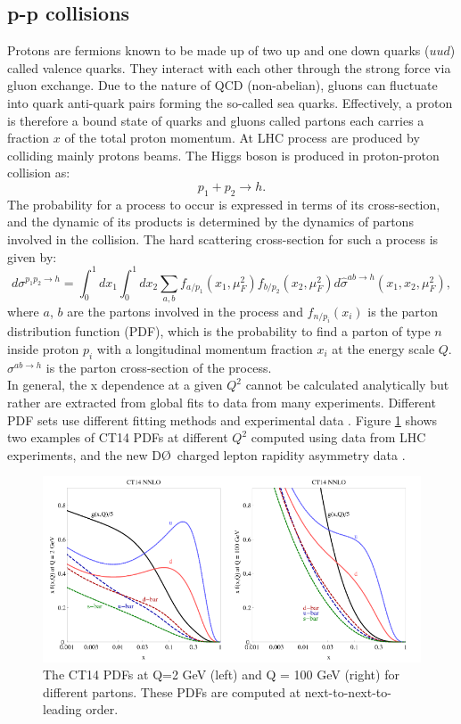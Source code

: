 \subsection{p-p collisions}
\label{chap1:H2012:PP}
Protons are fermions known to be made up of two up and one down quarks ($uud$) called valence quarks. They interact with each other through the strong force via gluon exchange. Due to the nature of QCD (non-abelian), gluons can fluctuate into quark anti-quark pairs forming the so-called sea quarks. Effectively, a proton is therefore a bound state of quarks and gluons called partons each carries a fraction $x$ of the total proton momentum. At LHC process are produced by colliding mainly protons beams. The Higgs boson is produced in proton-proton collision as:
\begin{equation}
    p_1 + p_2 \rightarrow h.
\end{equation}
The probability for a process to occur is expressed in terms of its cross-section, and the dynamic of its products is determined by the dynamics of partons involved in the collision. The hard scattering cross-section for such a process is given by:
\begin{equation}
    d \sigma^{p_{1} p_{2} \rightarrow h}=\int_{0}^{1} d x_{1} \int_{0}^{1} d x_{2} \sum_{a, b} f_{a / p_{1}}\left(x_{1}, \mu_{F}^{2}\right) f_{b / p_{2}}\left(x_{2}, \mu_{F}^{2}\right) d \hat{\sigma}^{a b \rightarrow h}\left(x_1, x_2, \mu_{F}^{2}\right), 
\end{equation}
where $a$, $b$ are the partons involved in the process and $f_{n/p_i}(x_i)$ is the parton distribution function (PDF), which is the probability to find a parton of type $n$ inside proton $p_i$ with a longitudinal momentum fraction $x_i$ at the energy scale $Q$. $\sigma^{a b \rightarrow h}$ is the parton cross-section of the process. \\
In general, the x dependence at a given $Q^2$ cannot be calculated analytically but rather are extracted from global fits to data from many experiments. Different PDF sets use different fitting methods and experimental data \cite{PDF}. Figure \ref{fig:chap1:H2012:PDF} shows two examples of CT14 PDFs at different $Q^2$ computed using data from LHC experiments, and the new D\O \ charged lepton rapidity asymmetry data \cite{CT14}. 
\begin{figure}[htbp]
    \centering
    \includegraphics[width=\textwidth]{Ch1/Img/PDFs.png}
    \caption{The CT14 PDFs at Q=2 GeV (left) and Q = 100 GeV (right) for different partons. These PDFs are computed at next-to-next-to-leading order.}
    \label{fig:chap1:H2012:PDF}
\end{figure}
